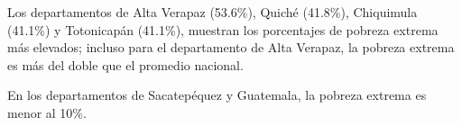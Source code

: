 Los departamentos de Alta Verapaz (53.6\%), Quiché (41.8\%), Chiquimula (41.1\%) y Totonicapán (41.1\%), muestran los porcentajes de pobreza extrema más elevados;  incluso para el departamento de Alta Verapaz, la pobreza extrema es más del doble que el promedio nacional.  
 
En los departamentos de Sacatepéquez y Guatemala, la pobreza extrema es menor al 10\%.